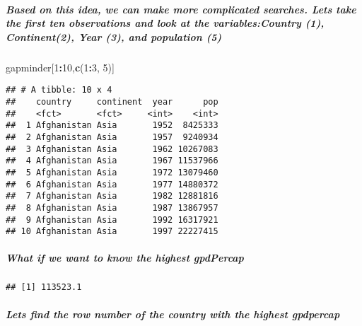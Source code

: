 \documentclass[]{article}
\newenvironment{Shaded}{\begin{snugshade}}{\end{snugshade}}
\newcommand{\KeywordTok}[1]{\textcolor[rgb]{0.13,0.29,0.53}{\textbf{#1}}}
\newcommand{\DecValTok}[1]{\textcolor[rgb]{0.00,0.00,0.81}{#1}}
\newcommand{\OperatorTok}[1]{\textcolor[rgb]{0.81,0.36,0.00}{\textbf{#1}}}
\newcommand{\NormalTok}[1]{#1}
\let\oldsubparagraph\subparagraph
\renewcommand{\subparagraph}[1]{\oldsubparagraph{#1}\mbox{}}
\begin{document}
\subparagraph{Based on this idea, we can make more complicated searches.
Lets take the first ten observations and look at the variables:Country
(1), Continent(2), Year (3), and population
(5)}\label{based-on-this-idea-we-can-make-more-complicated-searches.-lets-take-the-first-ten-observations-and-look-at-the-variablescountry-1-continent2-year-3-and-population-5}

\begin{Shaded}
\begin{Highlighting}[]
\NormalTok{gapminder[}\DecValTok{1}\OperatorTok{:}\DecValTok{10}\NormalTok{,}\KeywordTok{c}\NormalTok{(}\DecValTok{1}\OperatorTok{:}\DecValTok{3}\NormalTok{, }\DecValTok{5}\NormalTok{)]}
\end{Highlighting}
\end{Shaded}

\begin{verbatim}
## # A tibble: 10 x 4
##    country     continent  year      pop
##    <fct>       <fct>     <int>    <int>
##  1 Afghanistan Asia       1952  8425333
##  2 Afghanistan Asia       1957  9240934
##  3 Afghanistan Asia       1962 10267083
##  4 Afghanistan Asia       1967 11537966
##  5 Afghanistan Asia       1972 13079460
##  6 Afghanistan Asia       1977 14880372
##  7 Afghanistan Asia       1982 12881816
##  8 Afghanistan Asia       1987 13867957
##  9 Afghanistan Asia       1992 16317921
## 10 Afghanistan Asia       1997 22227415
\end{verbatim}

\subparagraph{What if we want to know the highest
gpdPercap}\label{what-if-we-want-to-know-the-highest-gpdpercap}

\begin{Shaded}
\end{Shaded}

\begin{verbatim}
## [1] 113523.1
\end{verbatim}

\subparagraph{Lets find the row number of the country with the highest
gpdpercap}\label{lets-find-the-row-number-of-the-country-with-the-highest-gpdpercap}

\begin{Shaded}
\end{Shaded}
\end{document}
